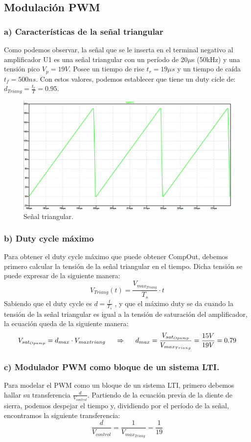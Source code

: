 \documentclass[e4_tp2_main.tex]{subfiles}
\begin{document}
\subsection{Modulaci\'on PWM}


\subsubsection*{a) Caracter\'isticas de la se\~nal triangular}
Como podemos observar, la señal que se le inserta en el terminal negativo al amplificador U1 es una señal triangular con un período de 20$\mu $s (50kHz) y una tensión pico $V_p=19 V$. Posee un tiempo de rise $t_r=19 \mu s$ y un tiempo de caída $t_f=500ns$. Con estos valores, podemos establecer que tiene un duty cicle de: $d_{Triang}= \frac{t_r}{T}=0.95$. 
\begin{figure}[H]
\centering
\includegraphics[width=0.4\linewidth]{Imagenes/Punto1/triang_shape.png}
\caption{Señal triangular.}
\end{figure}

\subsubsection*{b) Duty cycle m\'aximo}
Para obtener el duty cycle máximo que puede obtener CompOut, debemos primero calcular la tensión de la señal triangular en el tiempo. Dicha tensión se puede expresar de la siguiente manera:
\begin{equation}
V_{Triang}(t)= \frac{V_{max_{Triang}}}{T_s} \cdot t
\end{equation} 
Sabiendo que el duty cycle es $ d=\frac{t}{T_s}$  , y que el máximo duty se da cuando la tensión de la señal triangular es igual a la tensión de saturación del amplificador, la ecuación queda de la siguiente manera:
\begin{equation}
V_{sat_{Opamp}}= d_{max} \cdot V_{maxtriang} \hspace{0.5cm} \Rightarrow  \hspace{0.5cm} d_{max}= \frac{V_{sat_{Opamp}}}{V_{max_{Triang}}}=\frac{15 V}{19V}=0.79
\end{equation}
\subsubsection*{c) Modulador PWM como bloque de un sistema LTI.}
Para modelar el PWM como un bloque de un sistema LTI, primero debemos hallar su transferencia $\frac{d}{V_{control}}$. Partiendo de la ecuación previa de la diente de sierra, podemos despejar el tiempo y, dividiendo por el período de la señal, encontramos la siguiente transferencia:
\begin{equation}
\frac{d}{V_{control}}=\frac{1}{V_{max_{Triang}}}=\frac{1}{19}
\end{equation} 
\end{document}
